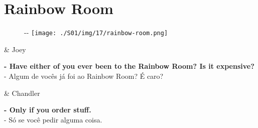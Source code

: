 \hypertarget{rainbow-room}{%
\section{Rainbow Room}\label{rainbow-room}}

\begin{figure}[!ht]
  \begin{adjustwidth}{-\oddsidemargin-1in}{-\rightmargin}
    \centering
    \texttt{[image: ./S01/img/17/rainbow-room.png]}
  \end{adjustwidth}
\end{figure}

\begin{tcolorbox}[enhanced,center upper,
    drop fuzzy shadow southeast, boxrule=0.3pt,
    lower separated=false, breakable,
    colframe=black!30!dialogoBorder,colback=white]
\begin{minipage}[c]{0.16\linewidth}
   & \centering \scriptsize{Joey}
\end{minipage}
\hfill
\begin{minipage}[c]{0.8\linewidth}
  \textbf{- Have either of you ever been to the Rainbow Room? Is it expensive?}\\
  - Algum de vocês já foi ao Rainbow Room? É caro?
\end{minipage}

\medskip
\begin{minipage}[c]{0.16\linewidth}
   & \centering \scriptsize{Chandler}
\end{minipage}
\hfill
\begin{minipage}[c]{0.8\linewidth}
  \textbf{- Only if you order stuff.}\\
  - Só se você pedir alguma coisa.
\end{minipage}
\end{tcolorbox}

